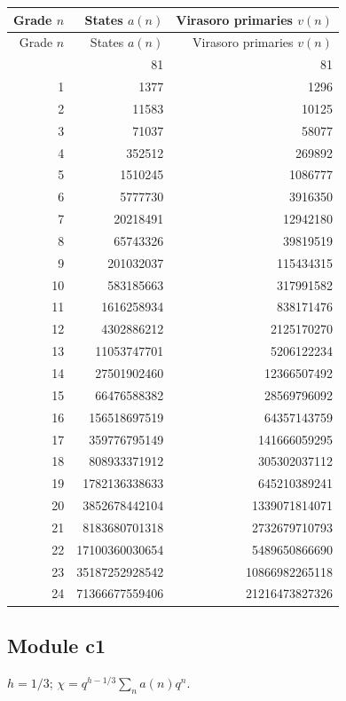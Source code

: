 \begingroup\small
\setlength{\tabcolsep}{5pt}
\begin{longtable}{@{}rrr@{}}
\toprule
Grade $n$ & States $a(n)$ & Virasoro primaries $v(n)$\\
\midrule\endfirsthead
\toprule
Grade $n$ & States $a(n)$ & Virasoro primaries $v(n)$\\
\midrule\endhead
\bottomrule\endfoot
0 & 81 & 81\\
1 & 1377 & 1296\\
2 & 11583 & 10125\\
3 & 71037 & 58077\\
4 & 352512 & 269892\\
5 & 1510245 & 1086777\\
6 & 5777730 & 3916350\\
7 & 20218491 & 12942180\\
8 & 65743326 & 39819519\\
9 & 201032037 & 115434315\\
10 & 583185663 & 317991582\\
11 & 1616258934 & 838171476\\
12 & 4302886212 & 2125170270\\
13 & 11053747701 & 5206122234\\
14 & 27501902460 & 12366507492\\
15 & 66476588382 & 28569796092\\
16 & 156518697519 & 64357143759\\
17 & 359776795149 & 141666059295\\
18 & 808933371912 & 305302037112\\
19 & 1782136338633 & 645210389241\\
20 & 3852678442104 & 1339071814071\\
21 & 8183680701318 & 2732679710793\\
22 & 17100360030654 & 5489650866690\\
23 & 35187252928542 & 10866982265118\\
24 & 71366677559406 & 21216473827326\\
\end{longtable}
\endgroup

\subsection{Module c1}
$h=1/3$; $\chi=q^{h-1/3}\sum_n a(n)q^n$.

